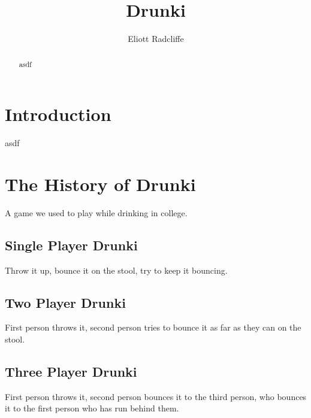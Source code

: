 \documentclass{amsart}
\numberwithin{equation}{section}
\begin{document}
\title{Drunki}

\author{Eliott Radcliffe}



\begin{abstract}
asdf
\end{abstract}

\maketitle

\section{Introduction}
asdf

\section{The History of Drunki}
A game we used to play while drinking in college.

\subsection{Single Player Drunki}
Throw it up, bounce it on the stool, try to keep it bouncing.

\subsection{Two Player Drunki}
First person throws it, second person tries to bounce it as far as they can on the stool.

\subsection{Three Player Drunki}
First person throws it, second person bounces it to the third person, who bounces it to the first person who has run behind them.
\end{document}
